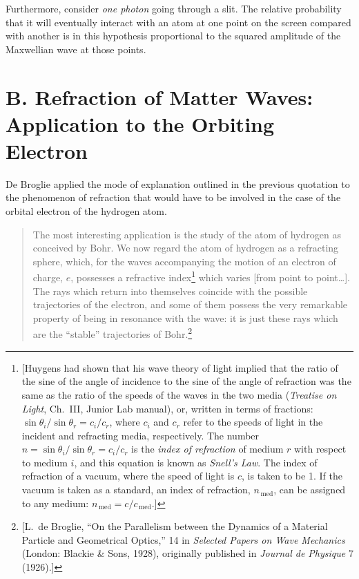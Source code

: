 Furthermore, consider \emph{one photon} going through a slit. The
relative probability that it will eventually interact with an atom at
one point on the screen compared with another is in this hypothesis
proportional to the squared amplitude of the Maxwellian wave at those
points.

\section*{B. Refraction of Matter Waves: Application to the Orbiting
Electron }

De Broglie applied the mode of explanation outlined in the previous
quotation to the phenomenon of refraction that would have to be involved
in the case of the orbital electron of the hydrogen atom.

\begin{quote}
The most interesting application is the study of the atom of hydrogen as
conceived by Bohr. We now regard the atom of hydrogen as a refracting
sphere, which, for the waves accompanying the motion of an electron of
charge, $e$, possesses a refractive index\footnote{\label{fn:deb_ref}{[}Huygens had
  shown that his wave theory of light implied that the ratio of the sine
  of the angle of incidence to the sine of the angle of refraction was
  the same as the ratio of the speeds of the waves in the two media
  (\emph{Treatise on Light}, Ch.~III, Junior Lab manual), or,
  written in terms of fractions: $\sin\theta_i/\sin\theta_r = c_i/c_r$, where
  $c_i$ and $c_r$ refer to the
  speeds of light in the incident and refracting media, respectively.
  The number $n = \sin\theta_i/\sin\theta_r = c_i/c_r$ is the \emph{index
  of refraction} of medium $r$ with respect to medium $i$, and this equation
  is known as \emph{Snell's Law}. The index of refraction of a vacuum,
  where the speed of light is $c$, is taken to be 1. If the vacuum
  is taken as a standard, an index of refraction,
  $n_{\,\textrm{med}}$, can be assigned to any medium:
  $n_{\,\textrm{med}} = c/c_{\,\textrm{med}}$.{]}}
which varies {[}from point to point\ldots]. The rays which return into
themselves coincide with the possible trajectories of the electron, and
some of them possess the very remarkable property of being in resonance
with the wave: it is just these rays which are the ``stable''
trajectories of Bohr.\footnote{{[}L.\ de Broglie, ``On the Parallelism
  between the Dynamics of a Material Particle and Geometrical Optics,''
  14 in \emph{Selected Papers on Wave Mechanics} (London: Blackie \&
  Sons, 1928), originally published in \emph{Journal de Physique} 7
  (1926).{]}}
\end{quote}

